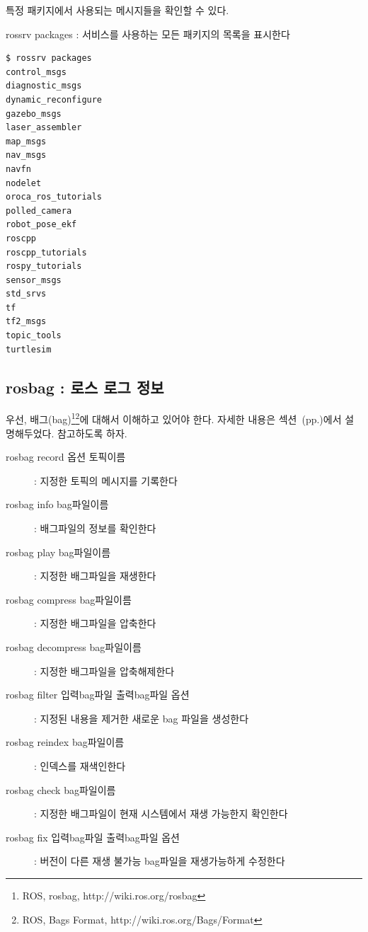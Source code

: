 \noindent
특정 패키지에서 사용되는 메시지들을 확인할 수 있다.

\vspace{\baselineskip}
\noindent
{}\circled{\thenum} rossrv packages : 서비스를 사용하는 모든 패키지의 목록을 표시한다

\begin{lstlisting}[language=ROS]
$ rossrv packages
control_msgs
diagnostic_msgs
dynamic_reconfigure
gazebo_msgs
laser_assembler
map_msgs
nav_msgs
navfn
nodelet
oroca_ros_tutorials
polled_camera
robot_pose_ekf
roscpp
roscpp_tutorials
rospy_tutorials
sensor_msgs
std_srvs
tf
tf2_msgs
topic_tools
turtlesim
\end{lstlisting}

\subsection{rosbag : 로스 로그 정보}

우선, 배그(bag)\footnote{ROS, rosbag, http://wiki.ros.org/rosbag}\footnote{ROS, Bags Format, http://wiki.ros.org/Bags/Format}에 대해서 이해하고 있어야 한다. 자세한 내용은 섹션~(pp.\pageref{def:RosBag})에서 설명해두었다. 참고하도록 하자.

\vspace{\baselineskip}
\noindent
\begin{description}
\item[rosbag record 옵션 토픽이름] : 지정한 토픽의 메시지를 기록한다
\item[rosbag info bag파일이름] : 배그파일의 정보를 확인한다
\item[rosbag play bag파일이름] : 지정한 배그파일을 재생한다

\item[rosbag compress bag파일이름] : 지정한 배그파일을 압축한다
\item[rosbag decompress bag파일이름] : 지정한 배그파일을 압축해제한다

\item[rosbag filter 입력bag파일 출력bag파일 옵션] : 지정된 내용을 제거한 새로운 bag 파일을 생성한다
\item[rosbag reindex bag파일이름] : 인덱스를 재색인한다

\item[rosbag check bag파일이름] : 지정한 배그파일이 현재 시스템에서 재생 가능한지 확인한다
\item[rosbag fix 입력bag파일 출력bag파일 옵션] : 버전이 다른 재생 불가능 bag파일을 재생가능하게 수정한다
\end{description}

